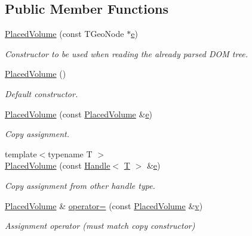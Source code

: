 \subsection*{Public Member Functions}
\begin{DoxyCompactItemize}
\item 
\hyperlink{class_d_d4hep_1_1_geometry_1_1_placed_volume_ad5ba4a479af1d8ae77357d34bb91fe00}{Placed\+Volume} (const T\+Geo\+Node $\ast$\hyperlink{_volumes_8cpp_a8a9a1f93e9b09afccaec215310e64142}{e})
\begin{DoxyCompactList}\small\item\em Constructor to be used when reading the already parsed D\+OM tree. \end{DoxyCompactList}\item 
\hyperlink{class_d_d4hep_1_1_geometry_1_1_placed_volume_aa8ea9d912c9b81e33801502cafd513fb}{Placed\+Volume} ()
\begin{DoxyCompactList}\small\item\em Default constructor. \end{DoxyCompactList}\item 
\hyperlink{class_d_d4hep_1_1_geometry_1_1_placed_volume_a1cd5673caae2e9568ea34c5076ba306b}{Placed\+Volume} (const \hyperlink{class_d_d4hep_1_1_geometry_1_1_placed_volume}{Placed\+Volume} \&\hyperlink{_volumes_8cpp_a8a9a1f93e9b09afccaec215310e64142}{e})
\begin{DoxyCompactList}\small\item\em Copy assignment. \end{DoxyCompactList}\item 
{\footnotesize template$<$typename T $>$ }\\\hyperlink{class_d_d4hep_1_1_geometry_1_1_placed_volume_a7c43caa0b98517132769b031a489eb6c}{Placed\+Volume} (const \hyperlink{class_d_d4hep_1_1_handle}{Handle}$<$ \hyperlink{class_t}{T} $>$ \&\hyperlink{_volumes_8cpp_a8a9a1f93e9b09afccaec215310e64142}{e})
\begin{DoxyCompactList}\small\item\em Copy assignment from other handle type. \end{DoxyCompactList}\item 
\hyperlink{class_d_d4hep_1_1_geometry_1_1_placed_volume}{Placed\+Volume} \& \hyperlink{class_d_d4hep_1_1_geometry_1_1_placed_volume_a3bd4abac5c77adc45a1c66aff5ff4cb9}{operator=} (const \hyperlink{class_d_d4hep_1_1_geometry_1_1_placed_volume}{Placed\+Volume} \&\hyperlink{_multi_view_8cpp_a8320ee13ac034dbf6d624fe8953dd337}{v})
\begin{DoxyCompactList}\small\item\em Assignment operator (must match copy constructor) \end{DoxyCompactList}\item 

\end{DoxyCompactItemize}
